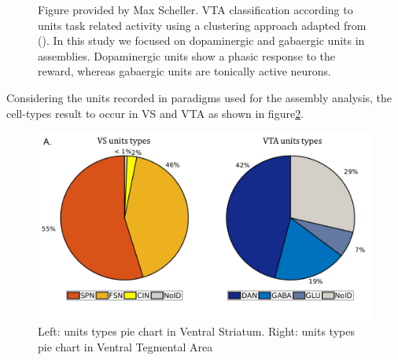 \begin{figure}
   \caption{Figure provided by Max Scheller. VTA classification according to units task related activity using a clustering approach adapted from (\cite{Uchida}). In this study we focused on dopaminergic and gabaergic units in assemblies. Dopaminergic units show a phasic response to the reward, whereas gabaergic units are tonically active neurons.}
    \label{fig:ClassificatonVTA}
\end{figure}
Considering the units recorded in paradigms used for the assembly analysis, the cell-types result to occur in VS and VTA as shown in figure\ref{fig:PieRegions}.
\begin{figure}
  \centering
    \includegraphics[scale=0.5]{figures/PieRegions1.pdf}
   \caption{Left: units types pie chart in Ventral Striatum. Right: units types pie chart in Ventral Tegmental Area}
    \label{fig:PieRegions}
\end{figure}

